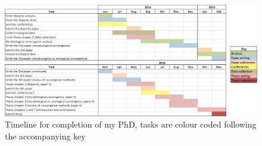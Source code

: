 \documentclass[12pt,a4paper]{article}
\begin{document}
\begin{landscape}
\begin{figure}[p]
\centering
\includegraphics[keepaspectratio=true]{Gannt+key.png}
\caption{Timeline for completion of my PhD, tasks are colour coded following the accompanying key}
\label{gannt}
\end{figure}
\end{landscape}




\end{document}
